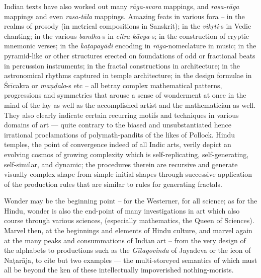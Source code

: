 Indian texts have also worked out many \textsl{rāga-svara} mappings, and \textsl{rasa-rāga} mappings and even \textsl{rasa-tāla} mappings. Amazing feats in various fora -- in the realms of prosody (in metrical compositions in Sanskrit); in the \textsl{vikṛti}-s in Vedic chanting; in the various \textsl{bandha}-s in \textsl{citra-kāvya}-s; in the construction of cryptic mnemonic verses; in the \textsl{kaṭapayādi} encoding in \textsl{rāga}-nomeclature in music; in the pyramid-like or other structures erected on foundations of odd or fractional beats in percussion instruments; in the fractal constructions in architecture; in the  astronomical rhythms captured in temple architecture; in the design formulae in Śrīcakra or \textsl{maṇḍala}-s etc -- all betray complex mathematical patterns, progressions and symmetries that arouse a sense of wonderment at once in the mind of the lay as well as the accomplished artist and the mathematician as well. They also clearly indicate certain recurring motifs and techniques in various domains of art --- quite contrary to the biased and unsubstantiated hence irrational proclamations of polymath-pandits of the likes of Pollock. Hindu temples, the point of convergence indeed of all Indic arts, verily depict an evolving cosmos of growing complexity which is self-replicating, self-generating, self-similar, and dynamic; the procedures therein are recursive and generate visually complex shape from simple initial shapes through successive application of the production rules that are similar to rules for generating fractals.

Wonder may be the beginning point -- for the Westerner, for all science; as for the Hindu, wonder is also the end-point of many investigations in art which also course through various sciences, (especially mathematics, the Queen of Sciences). Marvel then, at the beginnings and elements of Hindu culture, and marvel again at the many peaks and consummations of Indian art – from the very design of the alphabets to productions such as the \textsl{Gītagovinda} of Jayadeva or the icon of Naṭarāja, to cite but two examples --- the multi-storeyed semantics of which must all be beyond the ken of these intellectually impoverished nothing-morists.

